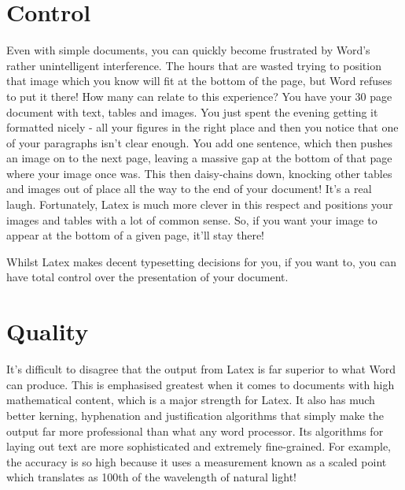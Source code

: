 \section{Control}
Even with simple documents, you can quickly become frustrated by Word's rather unintelligent interference. The hours that are wasted trying to position that image which you know will fit at the bottom of the page, but Word refuses to put it there! How many can relate to this experience? You have your 30 page document with text, tables and images. You just spent the evening getting it formatted nicely - all your figures in the right place and then you notice that one of your paragraphs isn't clear enough. You add one sentence, which then pushes an image on to the next page, leaving a massive gap at the bottom of that page where your image once was. This then daisy-chains down, knocking other tables and images out of place all the way to the end of your document! It's a real laugh. Fortunately, Latex is much more clever in this respect and positions your images and tables with a lot of common sense. So, if you want your image to appear at the bottom of a given page, it'll stay there!

Whilst Latex makes decent typesetting decisions for you, if you want to, you can have total control over the presentation of your document.

\section{Quality}
It's difficult to disagree that the output from Latex is far superior to what Word can produce. This is emphasised greatest when it comes to documents with high mathematical content, which is a major strength for Latex. It also has much better kerning, hyphenation and justification algorithms that simply make the output far more professional than what any word processor. Its algorithms for laying out text are more sophisticated and extremely fine-grained. For example, the accuracy is so high because it uses a measurement known as a scaled point which translates as 100th of the wavelength of natural light!

